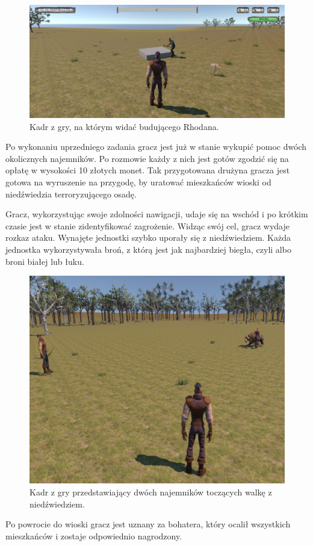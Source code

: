 \begin{figure}[h!]
    \centering
    \includegraphics[width=1\textwidth]{images/rozgrywka/rhodan9.png}
    \caption{Kadr z gry, na którym widać budującego Rhodana.}
\end{figure}
\FloatBarrier

Po wykonaniu uprzedniego zadania gracz jest już w stanie wykupić pomoc dwóch okolicznych
najemników. Po rozmowie każdy z nich jest gotów zgodzić się na opłatę w wysokości 10 złotych monet.
Tak przygotowana drużyna gracza jest gotowa na wyruszenie na przygodę, by uratować
mieszkańców wioski od niedźwiedzia terroryzującego osadę.

Gracz, wykorzystując swoje zdolności nawigacji, udaje się na wschód i po krótkim czasie jest w stanie zidentyfikować zagrożenie.
Widząc swój cel, gracz wydaje rozkaz ataku. Wynajęte jednostki szybko uporały się z niedźwiedziem. Każda jednostka wykorzystywała
broń, z którą jest jak najbardziej biegła, czyli albo broni białej lub łuku.

\begin{figure}[h]
\centering
\includegraphics[width=1\textwidth]{images/fight}
\caption{Kadr z gry przedstawiający dwóch najemników toczących walkę z niedźwiedziem.}
\end{figure}
\FloatBarrier

Po powrocie do wioski gracz jest uznany za bohatera, który ocalił wszystkich mieszkańców i zostaje odpowiednio nagrodzony.

